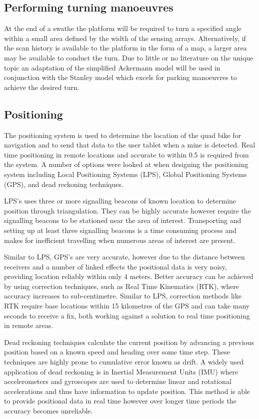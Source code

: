 \documentclass[main.tex]{subfiles}
\begin{document}
\subsection{Performing turning manoeuvres}
At the end of a swathe the platform will be required to turn a specified angle within a small area defined by the width of the sensing arrays. Alternatively, if the scan history is available to the platform in the form of a map, a larger area may be available to conduct the turn. Due to little or no literature on the unique topic an adaptation of the simplified Ackermann model will be used in conjunction with the Stanley model which excels for parking manoeuvres \parencite{snider2009} to achieve the desired turn.

\subsection{Positioning}
The positioning system is used to determine the location of the quad bike for navigation and to send that data to the user tablet when a mine is detected. Real time positioning in remote locations and accurate to within 0.5 is required from the system. A number of options were looked at when designing the positioning system including Local Positioning Systems (LPS), Global Positioning Systems (GPS), and dead reckoning techniques.

LPS's uses three or more signalling beacons of known location to determine position through triangulation. They can be highly accurate however require the signalling beacons to be stationed near the area of interest. Transporting and setting up at least three signalling beacons is a time consuming process and makes for inefficient travelling when numerous areas of interest are present.

Similar to LPS, GPS's are very accurate, however due to the distance between receivers and a number of linked effects the positional data is very noisy, providing location reliably within only 4 meters. Better accuracy can be achieved by using correction techniques, such as Real Time Kinematics (RTK), where accuracy increases to sub-centimetre. Similar to LPS, correction methods like RTK require base locations within 15 kilometres of the GPS and can take many seconds to receive a fix, both working against a solution to real time positioning in remote areas.

Dead reckoning techniques calculate the current position by advancing a previous position based on a known speed and heading over some time step. These techniques are highly prone to cumulative error known as drift. A widely used application of dead reckoning is in Inertial Measurement Units (IMU) where accelerometers and gyroscopes are used to determine linear and rotational accelerations and thus have information to update position. This method is able to provide positional data in real time however over longer time periods the accuracy becomes unreliable.
\end{document}
